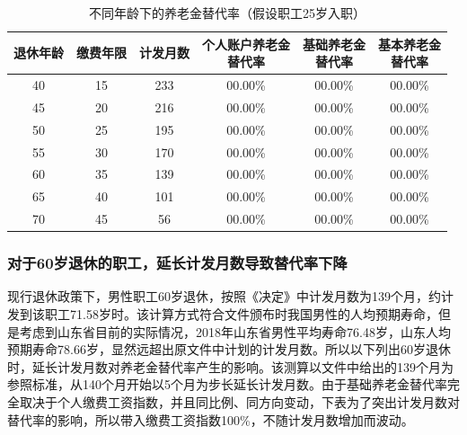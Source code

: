 \documentclass[a4paper,12pt]{ctexart}
\newcommand{\wuhao}{\fontsize{10.5pt}{15.75pt}\selectfont}
\numberwithin{equation}{section}
\begin{document}
\begin{spacing}{1.5}
\vspace{0.3cm}
\begin{table}[htbp]
\centering
\caption{不同年龄下的养老金替代率（假设职工25岁入职）}
\wuhao
\begin{tabular}{cccccc}
\toprule
退休年龄 & 缴费年限 & 计发月数 & \makecell{个人账户养老金\\替代率} & \makecell{基础养老金\\替代率} & \makecell{基本养老金\\替代率} \\
\midrule
40 & 15 & 233 & 00.00\% & 00.00\% & 00.00\% \\
45 & 20 & 216 & 00.00\% & 00.00\% & 00.00\% \\
50 & 25 & 195 & 00.00\% & 00.00\% & 00.00\% \\
55 & 30 & 170 & 00.00\% & 00.00\% & 00.00\% \\
60 & 35 & 139 & 00.00\% & 00.00\% & 00.00\% \\
65 & 40 & 101 & 00.00\% & 00.00\% & 00.00\% \\
70 & 45 & 56  & 00.00\% & 00.00\% & 00.00\% \\
\bottomrule
\end{tabular}
\end{table}

\subsubsection{对于60岁退休的职工，延长计发月数导致替代率下降}

现行退休政策下，男性职工60岁退休，按照《决定》中计发月数为139个月，约计发到该职工71.58岁时。该计算方式符合文件颁布时我国男性的人均预期寿命，但是考虑到山东省目前的实际情况，2018年山东省男性平均寿命76.48岁，山东人均预期寿命78.66岁，显然远超出原文件中计划的计发月数。所以以下列出60岁退休时，延长计发月数对养老金替代率产生的影响。该测算以文件中给出的139个月为参照标准，从140个月开始以5个月为步长延长计发月数。由于基础养老金替代率完全取决于个人缴费工资指数，并且同比例、同方向变动，下表为了突出计发月数对替代率的影响，所以带入缴费工资指数100\%，不随计发月数增加而波动。


\end{spacing}
\end{document}
